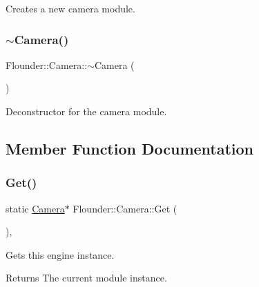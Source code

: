 Creates a new camera module. 

\mbox{\label{class_flounder_1_1_camera_aa79089a994c41771463daaf2c88807f0}} 
\subsubsection{\texorpdfstring{$\sim$\+Camera()}{~Camera()}}
{\footnotesize\ttfamily Flounder\+::\+Camera\+::$\sim$\+Camera (\begin{DoxyParamCaption}{ }\end{DoxyParamCaption})}



Deconstructor for the camera module. 



\subsection{Member Function Documentation}
\mbox{\label{class_flounder_1_1_camera_ab7e180abb10b8b0e4dd1009565174a53}} 
\subsubsection{\texorpdfstring{Get()}{Get()}}
{\footnotesize\ttfamily static \hyperlink{class_flounder_1_1_camera}{Camera}$\ast$ Flounder\+::\+Camera\+::\+Get (\begin{DoxyParamCaption}{ }\end{DoxyParamCaption})\hspace{0.3cm}{\ttfamily [inline]}, {\ttfamily [static]}}



Gets this engine instance. 

\begin{DoxyReturn}{Returns}
The current module instance. 
\end{DoxyReturn}
\mbox{\label{class_flounder_1_1_camera_a17176aafe2b546633e326e24c953a061}} 

